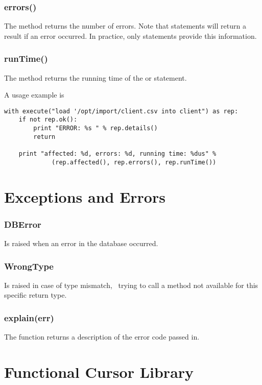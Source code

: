 \subsubsection{errors()}
The method returns the number of errors.
Note that  statements will
return a  result if an error occurred.
In practice, only  statements provide
this information.

\subsubsection{runTime()}
The method returns the running time of 
the  or  statement.

A usage example is

\begin{python}
\begin{lstlisting}
with execute("load '/opt/import/client.csv into client") as rep:
    if not rep.ok():
        print "ERROR: %s " % rep.details()
        return
    
    print "affected: %d, errors: %d, running time: %dus" % 
             (rep.affected(), rep.errors(), rep.runTime())
\end{lstlisting}
\end{python}

\section{Exceptions and Errors}
\subsubsection{DBError}
Is raised when an error in the database occurred.

\subsubsection{WrongType}
Is raised in case of type mismatch, \ie\
trying to call a method not available for
this specific return type.

\subsubsection{explain(err)}
The function  returns
a description of the error code passed in.

\section{Functional Cursor Library}\label{sec_func}
